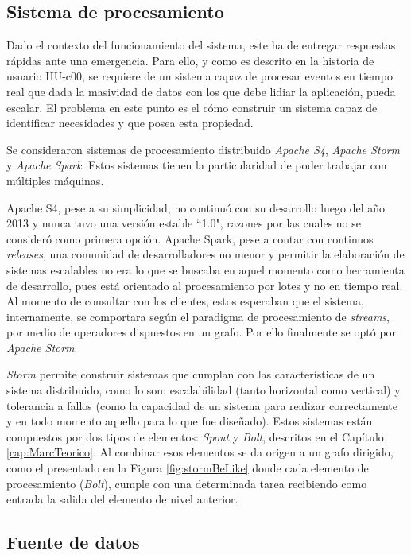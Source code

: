 \subsection{Sistema de procesamiento}
\label{sec:diseno:sistDeProce}

Dado el contexto del funcionamiento del sistema, este ha de entregar respuestas rápidas ante una emergencia. Para ello, y como es descrito en la historia de usuario HU-c00, se requiere de un sistema capaz de procesar eventos en tiempo real que dada la masividad de datos con los que debe lidiar la aplicación, pueda escalar. El problema en este punto es el cómo construir un sistema capaz de identificar necesidades y que posea esta propiedad.

Se consideraron sistemas de procesamiento distribuido \textit{Apache S4}, \textit{Apache Storm} y \textit{Apache Spark}. Estos sistemas tienen la particularidad de poder trabajar con múltiples máquinas. 

Apache S4, pese a su simplicidad, no continuó con su desarrollo luego del año 2013 y nunca tuvo una versión estable ``1.0", razones por las cuales no se consideró como primera opción. Apache Spark, pese a contar con continuos \textit{releases}, una comunidad de desarrolladores no menor y permitir la elaboración de sistemas escalables no era lo que se buscaba en aquel momento como herramienta de desarrollo, pues está orientado al procesamiento por lotes y no en tiempo real. Al momento de consultar con los clientes, estos esperaban que el sistema, internamente, se comportara según el paradigma de procesamiento de \textit{streams}, por medio de operadores dispuestos en un grafo. Por ello finalmente se optó por \textit{Apache Storm}.

\textit{Storm} permite construir sistemas que cumplan con las características de un sistema distribuido, como lo son: escalabilidad (tanto horizontal como vertical) y tolerancia a fallos (como la capacidad de un sistema para realizar correctamente y en todo momento aquello para lo que fue diseñado). Estos sistemas están compuestos por dos tipos de elementos: \textit{Spout} y \textit{Bolt}, descritos en el Capítulo \ref{cap:MarcTeorico}. Al combinar esos elementos se da origen a un grafo dirigido, como el presentado en la Figura \ref{fig:stormBeLike} donde cada elemento de procesamiento (\textit{Bolt}), cumple con una determinada tarea recibiendo como entrada la salida del elemento de nivel anterior.

\subsection{Fuente de datos}
\label{sec:diseno:obtenerDatos}

